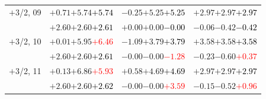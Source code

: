 \documentclass[compress]{beamer}
\begin{document}
\begin{frame}
\begin{tabular}{r | c | c | c}
$+$3/2, 09 & $+0.71$\hspace{0.1 cm}$+5.74$\hspace{0.1 cm}\textcolor{black}{$+5.74$} & $-0.25$\hspace{0.1 cm}$+5.25$\hspace{0.1 cm}\textcolor{black}{$+5.25$} & $+2.97$\hspace{0.1 cm}$+2.97$\hspace{0.1 cm}\textcolor{black}{$+2.97$} \\
           & $+2.60$\hspace{0.1 cm}$+2.60$\hspace{0.1 cm}\textcolor{black}{$+2.61$} & $+0.00$\hspace{0.1 cm}$+0.00$\hspace{0.1 cm}\textcolor{black}{$-0.00$} & $-0.06$\hspace{0.1 cm}$-0.42$\hspace{0.1 cm}\textcolor{black}{$-0.42$} \\
$+$3/2, 10 & $+0.01$\hspace{0.1 cm}$+5.95$\hspace{0.1 cm}\textcolor{red}{$+6.46$} & $-1.09$\hspace{0.1 cm}$+3.79$\hspace{0.1 cm}\textcolor{black}{$+3.79$} & $+3.58$\hspace{0.1 cm}$+3.58$\hspace{0.1 cm}\textcolor{black}{$+3.58$} \\
           & $+2.60$\hspace{0.1 cm}$+2.60$\hspace{0.1 cm}\textcolor{black}{$+2.61$} & $-0.00$\hspace{0.1 cm}$-0.00$\hspace{0.1 cm}\textcolor{red}{$-1.28$} & $-0.23$\hspace{0.1 cm}$-0.60$\hspace{0.1 cm}\textcolor{red}{$+0.37$} \\
$+$3/2, 11 & $+0.13$\hspace{0.1 cm}$+6.86$\hspace{0.1 cm}\textcolor{red}{$+5.93$} & $+0.58$\hspace{0.1 cm}$+4.69$\hspace{0.1 cm}\textcolor{black}{$+4.69$} & $+2.97$\hspace{0.1 cm}$+2.97$\hspace{0.1 cm}\textcolor{black}{$+2.97$} \\
           & $+2.60$\hspace{0.1 cm}$+2.60$\hspace{0.1 cm}\textcolor{black}{$+2.62$} & $-0.00$\hspace{0.1 cm}$-0.00$\hspace{0.1 cm}\textcolor{red}{$+3.59$} & $-0.15$\hspace{0.1 cm}$-0.52$\hspace{0.1 cm}\textcolor{red}{$+0.96$} \\

\end{tabular}
\end{frame}
\end{document}
